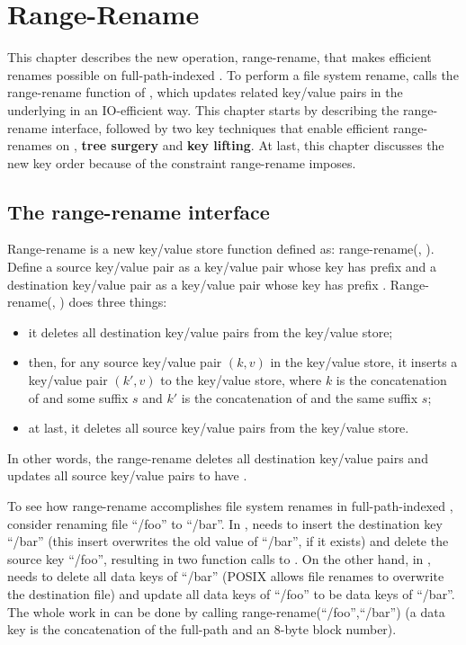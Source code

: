 \chapter{Range-Rename}
\label{chap:rename}

This chapter describes the new \bet operation, range-rename, that makes
efficient renames possible on full-path-indexed \betrfs.
To perform a file system rename, \betrfs calls the range-rename function of
\fti,
which updates related key/value pairs in the underlying \bet in an IO-efficient
way.
This chapter starts by describing the range-rename interface,
followed by two key techniques that enable efficient range-renames
on \bets, \textbf{tree surgery} and \textbf{key lifting}.
At last, this chapter discusses the new \betrfs key order because of the
constraint range-rename imposes.

\section{The range-rename interface}

Range-rename is a new key/value store function defined as:
range-rename(\spre, \dpre).
Define a source key/value pair as a key/value pair whose key has prefix \spre
and a destination key/value pair as a key/value pair whose key has prefix \dpre.
Range-rename(\spre, \dpre) does three things:
\begin{itemize}
\item it deletes all destination key/value pairs from the key/value store;
\item then, for any source key/value pair $(k,v)$ in the key/value store,
it inserts a key/value pair $(k',v)$ to the key/value store,
where $k$ is the concatenation of \spre and some suffix $s$ and $k'$ is the
concatenation of \dpre and the same suffix $s$;
\item at last, it deletes all source key/value pairs from the key/value store.
\end{itemize}
In other words, the range-rename deletes all destination key/value pairs and
updates all source key/value pairs to have \dpre.

To see how range-rename accomplishes file system renames in full-path-indexed
\betrfs, consider renaming file ``/foo'' to ``/bar''.
In \mdb, \betrfs needs to insert the destination key ``/bar''
(this insert overwrites the old value of ``/bar'', if it exists)
and delete the source key ``/foo'', resulting in two function calls to \fti.
On the other hand, in \ddb, \betrfs needs to delete all data keys of ``/bar''
(POSIX allows file renames to overwrite the destination file) and update all
data keys of ``/foo'' to be data keys of ``/bar''.
The whole work in \ddb can be done by calling range-rename(``/foo'',``/bar'')
(a data key is the concatenation of the full-path and an 8-byte block number).

